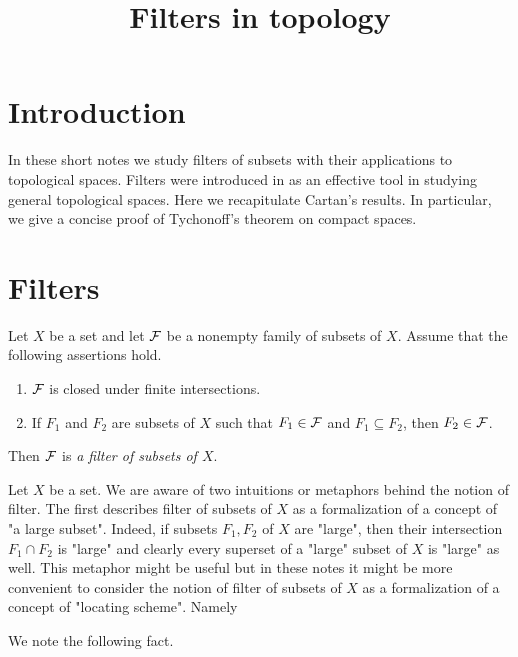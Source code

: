 



\title{Filters in topology}
\date{}
\maketitle

\section{Introduction}
\noindent
In these short notes we study filters of subsets with their applications to topological spaces. Filters were introduced in \cite{cartan1937filters} as an effective tool in studying general topological spaces. Here we recapitulate Cartan's results. In particular, we give a concise proof of Tychonoff's theorem on compact spaces.

\section{Filters}

\begin{definition}
Let $X$ be a set and let ${\mathcal F}$ be a nonempty family of subsets of $X$. Assume that the following assertions hold.
\begin{enumerate}[label=\textbf{(\arabic*)}, leftmargin=*]
\item ${\mathcal F}$ is closed under finite intersections.
\item If $F_1$ and $F_2$ are subsets of $X$ such that $F_1 \in {\mathcal F}$ and $F_1\subseteq F_2$, then $F_2 \in {\mathcal F}$.
\end{enumerate}
Then ${\mathcal F}$ is \textit{a filter of subsets of $X$}.
\end{definition}

\begin{remark}\label{remark:intuition_for_filters}
Let $X$ be a set. We are aware of two intuitions or metaphors behind the notion of filter. The first describes filter of subsets of $X$ as a formalization of a concept of "a large subset". Indeed, if subsets $F_1,F_2$ of $X$ are "large", then their intersection $F_1\cap F_2$ is "large" and clearly every superset of a "large" subset of $X$ is "large" as well. This metaphor might be useful but in these notes it might be more convenient to consider the notion of filter of subsets of $X$ as a formalization of a concept of "locating scheme". Namely 


\end{remark}
\noindent
We note the following fact. 

